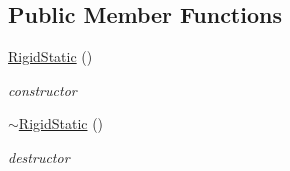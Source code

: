 \subsection*{Public Member Functions}
\begin{DoxyCompactItemize}
\item 
\hypertarget{classContent_1_1Actor_1_1Renderer_1_1RigidStatic_ac65a80f4fb43afaa34d0b3b165d32a03}{
\hyperlink{classContent_1_1Actor_1_1Renderer_1_1RigidStatic_ac65a80f4fb43afaa34d0b3b165d32a03}{RigidStatic} ()}
\label{classContent_1_1Actor_1_1Renderer_1_1RigidStatic_ac65a80f4fb43afaa34d0b3b165d32a03}

\begin{DoxyCompactList}\small\item\em constructor \item\end{DoxyCompactList}\item 
\hypertarget{classContent_1_1Actor_1_1Renderer_1_1RigidStatic_acd0363205ee98863931d563b61af515c}{
\hyperlink{classContent_1_1Actor_1_1Renderer_1_1RigidStatic_acd0363205ee98863931d563b61af515c}{$\sim$RigidStatic} ()}
\label{classContent_1_1Actor_1_1Renderer_1_1RigidStatic_acd0363205ee98863931d563b61af515c}

\begin{DoxyCompactList}\small\item\em destructor \item\end{DoxyCompactList}\end{DoxyCompactItemize}
